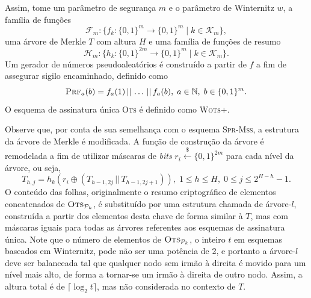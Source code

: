 \documentclass{ufsctex/ufsctex}
\newcommand{\hh}{\mathcal{H}}
\newcommand{\pk}{\mathcal{P}_{k}}
\newcommand{\concat}{\, \vert{} \vert{} \,}
\newcommand{\binwds}[1]{\{0, 1\}^{#1}}
\newcommand{\random}{\stackrel{\$}{\longleftarrow}}
\newcommand{\wotsplus}{\textsc{Wots+}}
\newcommand{\sprmss}{\textsc{Spr-Mss}}
\begin{document}
Assim, tome um parâmetro de segurança $m$ e o parâmetro de Winternitz $w$, a
família de funções \[\mathcal{F}_{m} : \{f_{k} : \binwds{m} \longrightarrow
\binwds{m} \mid k \in \mathcal{K}_{m}\},\] uma árvore de Merkle $T$ com altura
$H$ e uma família de funções de resumo \[\hh{}_{m} : \{h_{k} : \binwds{2m}
\longrightarrow \binwds{m} \mid k \in \mathcal{K}_{m}\}.\] Um gerador de
números pseudoaleatórios é construído a partir de $f$ a fim de assegurar sigilo
encaminhado, definido como
\begin{equation}
  \textsc{Prf}_{a}(b) = f_{a}(1) \concat \dots \concat f_{a}(b),
    \; a \in \mathbb{N}, \; b \in \binwds{m}.
\end{equation}
O esquema de assinatura única \textsc{Ots} é definido como \wotsplus{}.

Observe que, por conta de sua semelhança com o esquema \sprmss{}, a estrutura
da árvore de Merkle é modificada. A função de construção da árvore é remodelada
a fim de utilizar máscaras de \emph{bits} $r_{i} \random{}
\binwds{2m}$ para cada nível da árvore, ou seja,
\begin{equation}
  T_{h, j} = h_{k}(r_{i} \oplus (T_{h - 1, 2j} \concat T_{h - 1, 2j + 1})),
    \; 1 \leq h \leq H, \; 0 \leq j \leq 2^{H - h} - 1.
\end{equation}
O conteúdo das folhas, originalmente o resumo criptográfico de elementos
concatenados de $\textsc{Ots}_{\pk{}}$, é substituído por uma estrutura chamada
de árvore-$l$, construída a partir dos elementos desta chave de forma similar à
$T$, mas com máscaras iguais para todas as árvores referentes aos esquemas de
assinatura única. Note que o número de elementos de $\textsc{Ots}_{\pk{}}$, o
inteiro $t$ em esquemas baseados em Winternitz, pode não ser uma potência de 2,
e portanto a árvore-$l$ deve ser balanceada tal que qualquer nodo sem irmão à
direita é movido para um nível mais alto, de forma a tornar-se um irmão à
direita de outro nodo. Assim, a altura total é de $\lceil \log_{2} t \rceil$,
mas não considerada no contexto de $T$.
\end{document}
